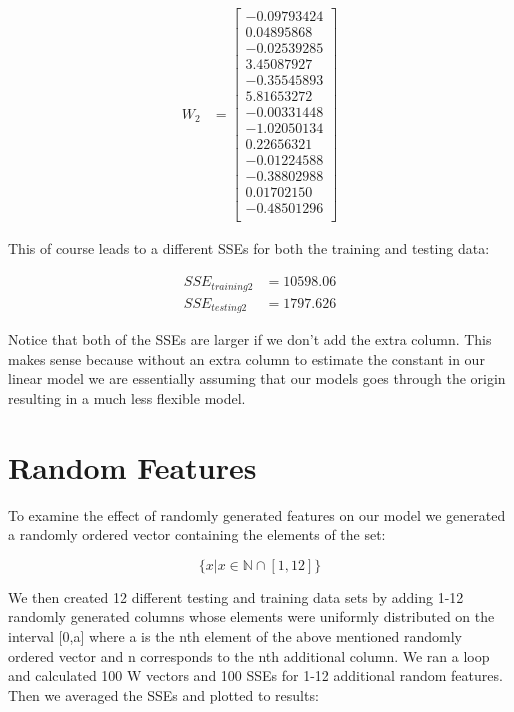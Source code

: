 \documentclass{article}
\begin{document}
	\begin{align}
		W_{2} &= \begin{bmatrix}
			-0.09793424 \\
			0.04895868 \\
			-0.02539285 \\
			3.45087927 \\
			-0.35545893 \\
			5.81653272 \\
			-0.00331448 \\
			-1.02050134 \\
			0.22656321 \\
			-0.01224588 \\
			-0.38802988 \\
			0.01702150 \\
			-0.48501296 \\
		\end{bmatrix}
	\end{align}
	
	This of course leads to a different SSEs for both the training and testing data:
	
	\begin{align}
	SSE_{training 2} &= 10598.06 \\
	SSE_{testing 2} &= 1797.626
	\end{align}
	
Notice that both of the SSEs are larger if we don't add the extra column. This makes sense because without an extra column to estimate the constant in our linear model we are essentially assuming that our models goes through the origin resulting in a much less flexible model.
	
	\section{Random Features}
	
To examine the effect of randomly generated features on our model we generated a randomly ordered vector containing the elements of the set:
	
	$$
	\{x|x\in\mathbb{N} \cap [1,12] \}
	$$
	
We then created 12 different testing and training data sets by adding 1-12 randomly generated columns whose elements were uniformly distributed on the interval [0,a] where a is the nth element of the above mentioned randomly ordered vector and n corresponds to the nth additional column. We ran a loop and calculated 100 W vectors and 100 SSEs for 1-12 additional random features. Then we averaged the SSEs and plotted to results:
\newpage
	
\end{document}
